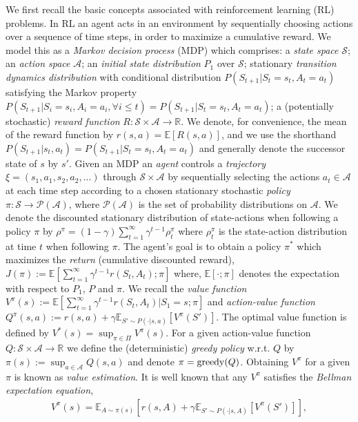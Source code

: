 \documentclass[letterpaper]{article}
\newcommand{\cA}{{\mathcal A}}
\newcommand{\cS}{{\mathcal S}}
\newcommand{\cP}{{\mathcal P}}
\newcommand{\E}{{\mathbb E}}
\newcommand{\R}{{\mathbb R}}
\newcommand{\greedy}{\operatornamewithlimits{greedy}}
\begin{document}
We first recall the basic concepts associated with reinforcement learning (RL) problems. In RL an agent acts in an environment by sequentially choosing actions over a sequence of time steps, in order to maximize a cumulative reward. We model this as a \emph{Markov decision process} (MDP) which comprises: a \emph{state space} $\cS$; an \emph{action space} $\cA$; an \emph{initial state distribution} $P_1$ over $\cS$; stationary \emph{transition dynamics distribution} with conditional distribution $P(S_{t+1} |S_t=s_t,A_t=a_t)$ satisfying the Markov property $P(S_{t+1}|S_i=s_i, A_i=a_i ,\forall i\le t) = P(S_{t+1} |S_t=s_t,A_t=a_t)$; a (potentially stochastic) \emph{reward function} $R:\cS\times\cA\to \R$. We denote, for convenience, the mean of the reward function by $r(s,a) = \E [R(s,a)]$, and we use the shorthand $P(S_{t+1} |s_t,a_t) = P(S_{t+1} |S_t=s_t,A_t=a_t) $ and generally denote the successor state of $s$ by $s'$. Given an MDP an \emph{agent} controls a \emph{trajectory} $\xi = (s_1,a_1,s_2,a_2,...)$ through $\cS\times\cA$ by sequentially selecting the actions $a_t\in\cA$ at each time step according to a chosen stationary stochastic \emph{policy} $\pi:\cS\to\cP(\cA)$, where $\cP(\cA)$ is the set of probability distributions on $\cA$. We denote the discounted stationary distribution of state-actions when following a policy $\pi$ by $\rho^\pi = (1-\gamma)\sum_{t=1}^\infty \gamma^{t-1}  \rho_t^\pi$ where $\rho_t^\pi$ is the state-action distribution at time $t$ when following $\pi$. The agent's goal is to obtain a policy $\pi^*$ which maximizes the \emph{return} (cumulative discounted reward), $J(\pi):= \E [\sum_{t=1}^\infty \gamma^{t-1} r(S_t,A_t) ; \pi]$ where,  $\E [ \cdot ; \pi]$ denotes the expectation with respect to $P_1$, $P$ and $\pi$. We recall the \emph{value function} $V^\pi(s) :=  \E [\sum_{t=1}^\infty \gamma^{t-1} r(S_t,A_t) | S_1 =s ; \pi]$ and \emph{action-value function} $Q^\pi(s,a) := r(s,a) + \gamma \E_{S'\sim P(\cdot|s,a)} [V^\pi(S')]$. The optimal value function is defined by $V^*(s) = \sup_{\pi\in\Pi} V^\pi(s)$.
For a given action-value function $Q:\cS\times\cA\to\R$ we define the (deterministic) \emph{greedy policy} w.r.t. $Q$ by $\pi(s) := \sup_{a\in\cA} Q(s,a)$ and denote $\pi = {\greedy}(Q)$. Obtaining $V^\pi$ for a given $\pi$ is known as \emph{value estimation}. It is well known that any $V^\pi$ satisfies the \emph{Bellman expectation equation},
\begin{align}
V^\pi(s) = \E_{A\sim\pi(s)} [ r(s,A) + \gamma \E_{S'\sim P(\cdot|s,A)} [V^\pi(S')] ], \label{BellmanExpectation} 
\end{align}
\end{document}
